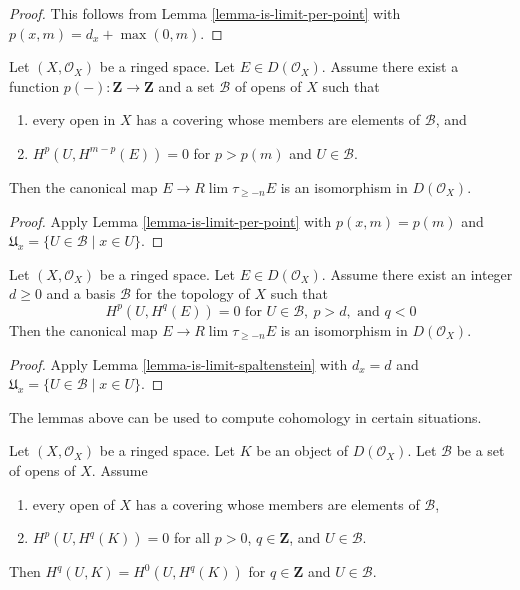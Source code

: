 \begin{proof}
This follows from Lemma \ref{lemma-is-limit-per-point}
with $p(x, m) = d_x + \max(0, m)$.
\end{proof}

\begin{lemma}
\label{lemma-is-limit}
Let $(X, \mathcal{O}_X)$ be a ringed space. Let $E \in D(\mathcal{O}_X)$.
Assume there exist a function $p(-) : \mathbf{Z} \to \mathbf{Z}$
and a set $\mathcal{B}$ of opens of $X$ such that
\begin{enumerate}
\item every open in $X$ has a covering whose members are
elements of $\mathcal{B}$, and
\item $H^p(U, H^{m - p}(E)) = 0$ for $p > p(m)$ and $U \in \mathcal{B}$.
\end{enumerate}
Then the canonical map $E \to R\lim \tau_{\geq -n} E$
is an isomorphism in $D(\mathcal{O}_X)$.
\end{lemma}

\begin{proof}
Apply Lemma \ref{lemma-is-limit-per-point}
with $p(x, m) = p(m)$ and
$\mathfrak{U}_x = \{U \in \mathcal{B} \mid x \in U\}$.
\end{proof}

\begin{lemma}
\label{lemma-is-limit-dimension}
Let $(X, \mathcal{O}_X)$ be a ringed space. Let $E \in D(\mathcal{O}_X)$.
Assume there exist an integer $d \geq 0$ and a basis $\mathcal{B}$ for the
topology of $X$ such that
$$
H^p(U, H^q(E)) = 0 \text{ for }
U \in \mathcal{B},\ p > d, \text{ and }q < 0
$$
Then the canonical map $E \to R\lim \tau_{\geq -n} E$
is an isomorphism in $D(\mathcal{O}_X)$.
\end{lemma}

\begin{proof}
Apply Lemma \ref{lemma-is-limit-spaltenstein} with $d_x = d$
and $\mathfrak{U}_x = \{U \in \mathcal{B} \mid x \in U\}$.
\end{proof}

\noindent
The lemmas above can be used to compute cohomology
in certain situations.

\begin{lemma}
\label{lemma-cohomology-over-U-trivial}
Let $(X, \mathcal{O}_X)$ be a ringed space. Let $K$
be an object of $D(\mathcal{O}_X)$.
Let $\mathcal{B}$ be a set of opens of $X$. Assume
\begin{enumerate}
\item every open of $X$ has a covering whose members are
elements of $\mathcal{B}$,
\item $H^p(U, H^q(K)) = 0$ for all $p > 0$, $q \in \mathbf{Z}$, and
$U \in \mathcal{B}$.
\end{enumerate}
Then $H^q(U, K) = H^0(U, H^q(K))$ for $q \in \mathbf{Z}$
and $U \in \mathcal{B}$.
\end{lemma}

